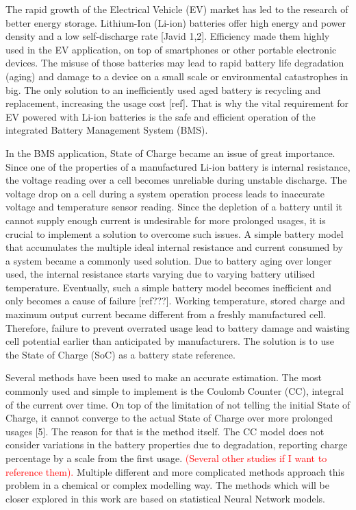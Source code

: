 The rapid growth of the Electrical Vehicle (EV) market has led to the research of better energy storage.
Lithium-Ion (Li-ion) batteries offer high energy and power density and a low self-discharge rate [Javid 1,2].
Efficiency made them highly used in the EV application, on top of smartphones or other portable electronic devices.
The misuse of those batteries may lead to rapid battery life degradation (aging) and damage to a device on a small scale or environmental catastrophes in big.
The only solution to an inefficiently used aged battery is recycling and replacement, increasing the usage cost [ref].
That is why the vital requirement for EV powered with Li-ion batteries is the safe and efficient operation of the integrated Battery Management System (BMS).

%
%
In the BMS application, State of Charge became an issue of great importance.
Since one of the properties of a manufactured Li-ion battery is internal resistance, the voltage reading over a cell becomes unreliable during unstable discharge.
The voltage drop on a cell during a system operation process leads to inaccurate voltage and temperature sensor reading.
Since the depletion of a battery until it cannot supply enough current is undesirable for more prolonged usages, it is crucial to implement a solution to overcome such issues.
A simple battery model that accumulates the multiple ideal internal resistance and current consumed by a system became a commonly used solution.
Due to battery aging over longer used, the internal resistance starts varying due to varying battery utilised temperature.
Eventually, such a simple battery model becomes inefficient and only becomes a cause of failure [ref???].
Working temperature, stored charge and maximum output current became different from a freshly manufactured cell.
Therefore, failure to prevent overrated usage lead to battery damage and waisting cell potential earlier than anticipated by manufacturers.
The solution is to use the State of Charge (SoC) as a battery state reference.

%
%
Several methods have been used to make an accurate estimation.
The most commonly used and simple to implement is the Coulomb Counter (CC), integral of the current over time.
On top of the limitation of not telling the initial State of Charge, it cannot converge to the actual State of Charge over more prolonged usages [5].
The reason for that is the method itself.
The CC model does not consider variations in the battery properties due to degradation, reporting charge percentage by a scale from the first usage.
\textcolor{red}{(Several other studies if I want to reference them).}
Multiple different and more complicated methods approach this problem in a chemical or complex modelling way.
The methods which will be closer explored in this work are based on statistical Neural Network models.


